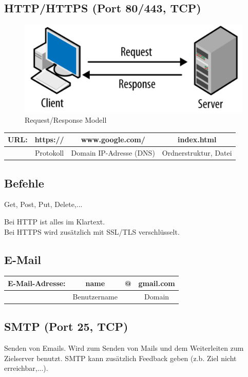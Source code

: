 \subsection*{HTTP/HTTPS (Port 80/443, TCP)}
\begin{figure}[H]
	\centering
	\includegraphics[width=0.8\linewidth]{figures/request_response.png}
	\caption{Request/Response Modell}
\end{figure}

\begin{table}[H]
	\begin{tabular}{c|c|c|c}
		URL: & https:// & www.google.com/ & index.html \\
		\hline
		& Protokoll & Domain IP-Adresse (DNS) & Ordnerstruktur, Datei
	\end{tabular}
\end{table}

\subsection*{Befehle}
Get, Post, Put, Delete,...

Bei HTTP ist alles im Klartext. \\
Bei HTTPS wird zusätzlich mit SSL/TLS verschlüsselt.

\subsection*{E-Mail}
\begin{table}[H]
	\begin{tabular}{c|c|c|c}
		E-Mail-Adresse: & name & @ & gmail.com \\
		\hline
		& Benutzername & & Domain
	\end{tabular}
\end{table}

\subsection*{SMTP (Port 25, TCP)}
Senden von Emails. Wird zum Senden von Mails und dem Weiterleiten zum Zielserver benutzt. SMTP kann zusätzlich Feedback geben (z.b. Ziel nicht erreichbar,...).

